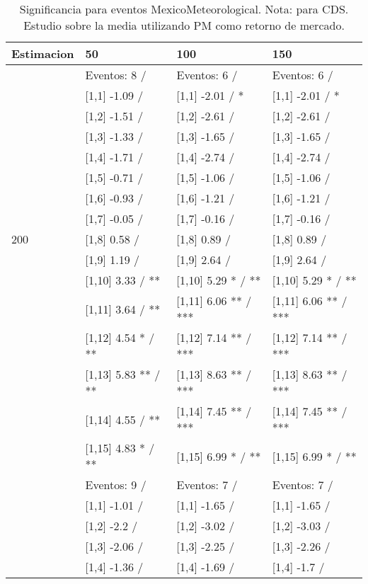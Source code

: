 \begin{table}

\caption{Significancia para eventos MexicoMeteorological. Nota: para CDS. Estudio sobre la media utilizando PM como retorno de mercado.}
\centering
\begin{tabular}[t]{llll}
\toprule
Estimacion & 50 & 100 & 150\\
\midrule
 & Eventos:  8 / & Eventos:  6 / & Eventos:  6 /\\
 & {}[1,1] -1.09  / & {}[1,1] -2.01  / * & {}[1,1] -2.01  / *\\
 & {}[1,2] -1.51  / & {}[1,2] -2.61  / & {}[1,2] -2.61  /\\
 & {}[1,3] -1.33  / & {}[1,3] -1.65  / & {}[1,3] -1.65  /\\
 & {}[1,4] -1.71  / & {}[1,4] -2.74  / & {}[1,4] -2.74  /\\
\addlinespace
 & {}[1,5] -0.71  / & {}[1,5] -1.06  / & {}[1,5] -1.06  /\\
 & {}[1,6] -0.93  / & {}[1,6] -1.21  / & {}[1,6] -1.21  /\\
 & {}[1,7] -0.05  / & {}[1,7] -0.16  / & {}[1,7] -0.16  /\\
200 & {}[1,8] 0.58  / & {}[1,8] 0.89  / & {}[1,8] 0.89  /\\
 & {}[1,9] 1.19  / & {}[1,9] 2.64  / & {}[1,9] 2.64  /\\
\addlinespace
 & {}[1,10] 3.33  / ** & {}[1,10] 5.29 * / ** & {}[1,10] 5.29 * / **\\
 & {}[1,11] 3.64  / ** & {}[1,11] 6.06 ** / *** & {}[1,11] 6.06 ** / ***\\
 & {}[1,12] 4.54 * / ** & {}[1,12] 7.14 ** / *** & {}[1,12] 7.14 ** / ***\\
 & {}[1,13] 5.83 ** / ** & {}[1,13] 8.63 ** / *** & {}[1,13] 8.63 ** / ***\\
 & {}[1,14] 4.55  / ** & {}[1,14] 7.45 ** / *** & {}[1,14] 7.45 ** / ***\\
\addlinespace
 & {}[1,15] 4.83 * / ** & {}[1,15] 6.99 * / ** & {}[1,15] 6.99 * / **\\
 & Eventos:  9 / & Eventos:  7 / & Eventos:  7 /\\
 & {}[1,1] -1.01  / & {}[1,1] -1.65  / & {}[1,1] -1.65  /\\
 & {}[1,2] -2.2  / & {}[1,2] -3.02  / & {}[1,2] -3.03  /\\
 & {}[1,3] -2.06  / & {}[1,3] -2.25  / & {}[1,3] -2.26  /\\
\addlinespace
 & {}[1,4] -1.36  / & {}[1,4] -1.69  / & {}[1,4] -1.7  /\\

\end{tabular}
\end{table}
